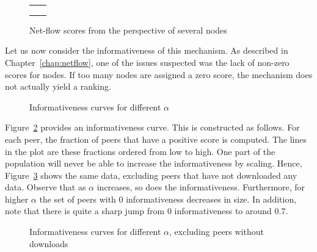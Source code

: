 \documentclass[a4paper,11pt]{book}
\theoremstyle{definition}
\begin{document}
\begin{figure}[ht]
    \begin{tabular}[ht]{cc}
         &
         \\

         &
         \\

         &
         \\
    \end{tabular}
    \caption{Net-flow scores from the perspective of several nodes}
    \label{fig:nf_alpha_comparison_2}
\end{figure}

Let us now consider the informativeness of this mechanism. As described in Chapter~\ref{chap:netflow},
one of the issues suspected was the lack of non-zero scores for nodes. If too many nodes are assigned
a zero score, the mechanism does not actually yield a ranking. 

\begin{figure}[ht]
    \centering
    
    \caption{Informativeness curves for different $\alpha$}
    \label{fig:info}
\end{figure}

Figure~\ref{fig:info} provides an informativeness curve. This is constructed as follows. For each
peer, the fraction of peers that have a positive score is computed. The lines in the plot
are these fractions ordered from low to high. One part of the population will never be able
to increase the informativeness by scaling. Hence, Figure~\ref{fig:info_filter} shows the same
data, excluding peers that have not downloaded any data. Observe that as $\alpha$ increases,
so does the informativeness. Furthermore, for higher $\alpha$ the set of peers with $0$ 
informativeness decreases in size. In addition, note that there is quite a sharp jump from 
$0$ informativeness to around $0.7$.

\begin{figure}[ht]
    \centering
    
    \caption{Informativeness curves for different $\alpha$, excluding peers without downloads}
    \label{fig:info_filter}
\end{figure}
\end{document}
